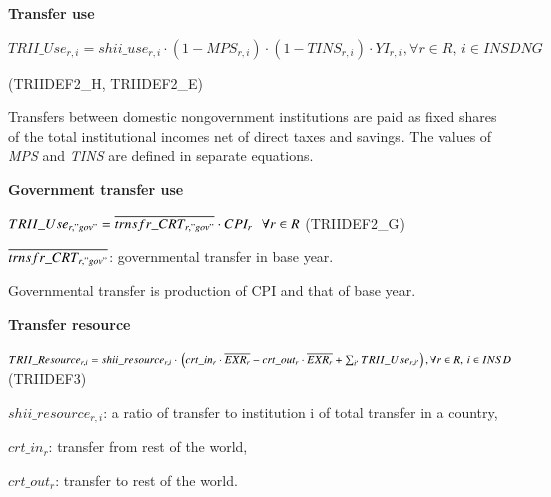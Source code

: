 \documentclass[10pt,a4paper,titlepage,dvipdfmx]{book}
\begin{document}
\begin{flushleft}\textbf{Transfer use}\end{flushleft}


\begin{center}$TRII\_ Use_{r,i}=shii\_ use_{r,i}\cdot \left(1-MPS_{r,i}\right)\cdot \left(1-TINS_{r,i}\right)\cdot YI_{r,i},\forall r\in R,\,i\in INSDNG$
\end{center}


\begin{flushright}(TRIIDEF2\_H, TRIIDEF2\_E)
\end{flushright}

Transfers between domestic nongovernment institutions are paid as fixed shares of the total institutional incomes net of direct taxes and savings. The values of \textit{MPS} and \textit{TINS} are defined in separate equations.

\begin{flushleft}\textbf{Government transfer use}\end{flushleft}


\begin{center}$TRII\_ Use_{r,"gov"}=\overline{trnsfr\_ CRT_{r,"gov"}}\cdot CPI_{r}\,\,\,\,\forall r\in R$ (TRIIDEF2\_G)
\end{center}

\begin{flushleft} $\overline{trnsfr\_ CRT_{r,"gov"}}$: governmental transfer in base year. \end{flushleft}

Governmental transfer is production of CPI and that of base year.

\begin{flushleft}\textbf{Transfer resource}\end{flushleft}


\begin{center}$TRII\_ Resource_{r,i}=shii\_ resource_{r,i}\cdot \newline \left(crt\_ in_{r}\cdot \overline{EXR_{r}}-crt\_ out_{r}\cdot \overline{EXR_{r}}+\sum _{i'}TRII\_ Use_{r,i'}\right),\forall r\in R,\,i\in INSD $  (TRIIDEF3)
\end{center}

\begin{flushleft}
$shii\_resource_{r,i}$: a ratio of transfer to institution i of total transfer in a country,

$crt\_in_{r}$: transfer from rest of the world,

$crt\_out_{r}$: transfer to rest of the world.
\end{flushleft}
\end{document}
